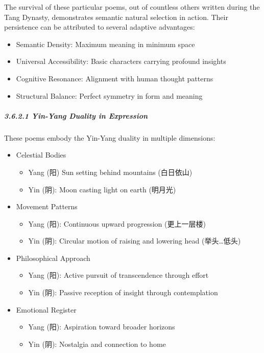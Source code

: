 \documentclass[
  11pt,
  letterpaper,
]{article}
\providecommand{\tightlist}{%
  \setlength{\itemsep}{0pt}\setlength{\parskip}{0pt}}
\begin{document}
The survival of these particular poems, out of countless others written
during the Tang Dynasty, demonstrates semantic natural selection in
action. Their persistence can be attributed to several adaptive
advantages:

\begin{itemize}
\tightlist
\item
  Semantic Density: Maximum meaning in minimum space
\item
  Universal Accessibility: Basic characters carrying profound insights
\item
  Cognitive Resonance: Alignment with human thought patterns
\item
  Structural Balance: Perfect symmetry in form and meaning
\end{itemize}

\hypertarget{yin-yang-duality-in-expression}{%
\subparagraph{3.6.2.1 Yin-Yang Duality in
Expression}\label{yin-yang-duality-in-expression}}

These poems embody the Yin-Yang duality in multiple dimensions:

\begin{itemize}
\tightlist
\item
  Celestial Bodies

  \begin{itemize}
  \tightlist
  \item
    Yang (阳) Sun setting behind mountains (白日依山)
  \item
    Yin (阴): Moon casting light on earth (明月光)
  \end{itemize}
\item
  Movement Patterns

  \begin{itemize}
  \tightlist
  \item
    Yang (阳): Continuous upward progression (更上一层楼)
  \item
    Yin (阴): Circular motion of raising and lowering head
    (举头\ldots 低头)
  \end{itemize}
\item
  Philosophical Approach

  \begin{itemize}
  \tightlist
  \item
    Yang (阳): Active pursuit of transcendence through effort
  \item
    Yin (阴): Passive reception of insight through contemplation
  \end{itemize}
\item
  Emotional Register

  \begin{itemize}
  \tightlist
  \item
    Yang (阳): Aspiration toward broader horizons
  \item
    Yin (阴): Nostalgia and connection to home
  \end{itemize}
\end{itemize}
\end{document}
